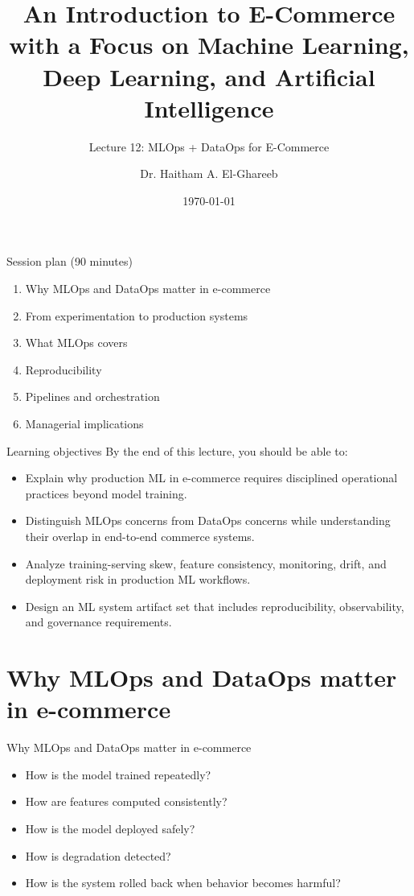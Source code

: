 \documentclass[aspectratio=169]{beamer}
\title[Lecture 12]{An Introduction to E-Commerce\\\small with a Focus on Machine Learning, Deep Learning, and Artificial Intelligence}
\subtitle{Lecture 12: MLOps + DataOps for E-Commerce}
\author{Dr. Haitham A. El-Ghareeb}
\institute{Faculty of Computers and Information Sciences \\ Mansoura University \\ Egypt}
\date{\today}
\begin{document}
\begin{frame}
  \titlepage
\end{frame}

\begin{frame}{Session plan (90 minutes)}
  \begin{enumerate}
    \item Why MLOps and DataOps matter in e-commerce
    \item From experimentation to production systems
    \item What MLOps covers
    \item Reproducibility
    \item Pipelines and orchestration
    \item Managerial implications
  \end{enumerate}
\end{frame}

\begin{frame}{Learning objectives}
  By the end of this lecture, you should be able to:
  \begin{itemize}
    \item Explain why production ML in e-commerce requires disciplined operational practices beyond model training.
    \item Distinguish MLOps concerns from DataOps concerns while understanding their overlap in end-to-end commerce systems.
    \item Analyze training-serving skew, feature consistency, monitoring, drift, and deployment risk in production ML workflows.
    \item Design an ML system artifact set that includes reproducibility, observability, and governance requirements.
  \end{itemize}
\end{frame}

\section{Why MLOps and DataOps matter in e-commerce}

\begin{frame}{Why MLOps and DataOps matter in e-commerce}
  \begin{itemize}
    \item How is the model trained repeatedly?
    \item How are features computed consistently?
    \item How is the model deployed safely?
    \item How is degradation detected?
    \item How is the system rolled back when behavior becomes harmful?
  \end{itemize}
\end{frame}
\end{document}
